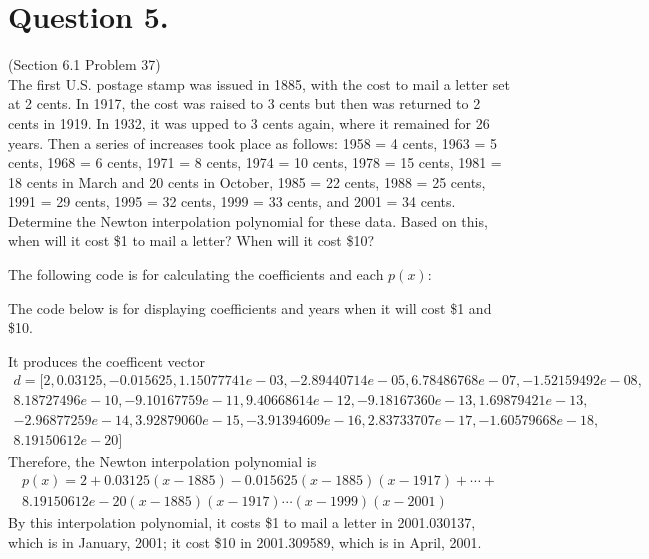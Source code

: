 \documentclass[10pt]{report}
\begin{document}
\section*{Question 5.}
(Section 6.1 Problem 37)\\
The first U.S. postage stamp was issued in 1885, with the cost to mail a letter set at 2 cents. In 1917, the cost was raised to 3 cents but then was returned to 2 cents in 1919. In 1932, it was upped to 3 cents again, where it remained for 26 years. Then a series of increases took place as follows: 1958 = 4 cents, 1963 = 5 cents, 1968 = 6 cents, 1971 = 8 cents, 1974 = 10 cents, 1978 = 15 cents, 1981 = 18 cents in March and 20 cents in October, 1985 = 22 cents, 1988 = 25 cents, 1991 = 29 cents, 1995 = 32 cents, 1999 = 33 cents, and 2001 = 34 cents. Determine the Newton interpolation polynomial for these data. Based on this, when will it cost \$1 to mail a letter? When will it cost \$10?

The following code is for calculating the coefficients and each $p(x)$:


The code below is for displaying coefficients and years when it will cost \$1 and \$10.


It produces the coefficent vector 
\begin{multline*}
d=[2,
0.03125,
-0.015625,
1.15077741e-03,
-2.89440714e-05,
6.78486768e-07,
-1.52159492e-08,\\
8.18727496e-10,
-9.10167759e-11,
9.40668614e-12,
-9.18167360e-13,
1.69879421e-13,\\
-2.96877259e-14,
3.92879060e-15,
-3.91394609e-16,
2.83733707e-17,
-1.60579668e-18,\\
8.19150612e-20]
\end{multline*}
Therefore, the Newton interpolation polynomial is
\begin{multline*}
	p(x) = 2 + 0.03125(x-1885) - 0.015625(x-1885)(x-1917) + \cdots +
	\\ 8.19150612e-20(x-1885)(x-1917)\cdots(x-1999)(x-2001)
\end{multline*}
By this interpolation polynomial, it costs \$1 to mail a letter in 2001.030137, which is in January, 2001; it cost \$10 in 2001.309589, which is in April, 2001.
\end{document}

